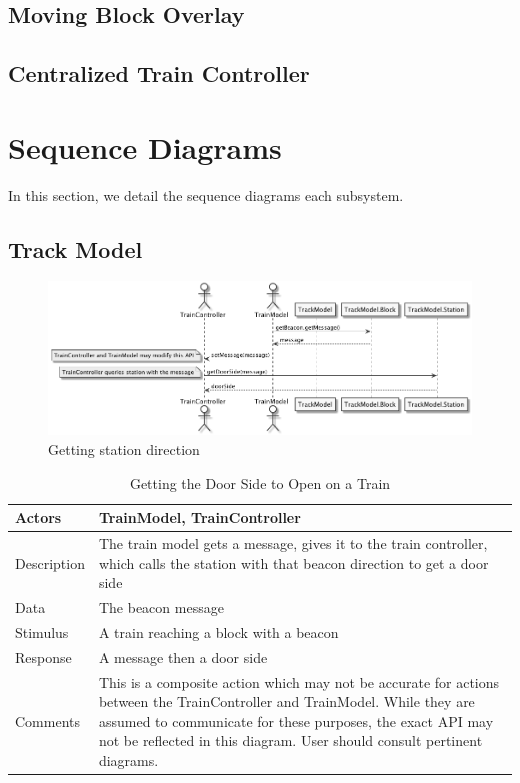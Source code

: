 \documentclass[]{article}
\begin{document}
\subsection{Moving Block Overlay}
\subsection{Centralized Train Controller}


\section{Sequence Diagrams}
In this section, we detail the sequence diagrams each subsystem.
\subsection{Track Model}
\begin{figure}[H]
	\centering
	\includegraphics[scale=.5]{getStationDirection.png}
	\caption{Getting station direction}
\end{figure}
\begin{table}[H]
	\centering
	\caption{Getting the Door Side to Open on a Train}
	\begin{tabular}{|l|l|}
		\hline
		Actors & \parbox[t]{10cm}{TrainModel, TrainController} \\ \hline
		Description & \parbox[t]{10cm}{The train model gets a message, gives it to the train controller, which calls the station with that beacon direction to get a door side} \\ \hline
		Data &  \parbox[t]{10cm}{The beacon message} \\ \hline
		Stimulus &  \parbox[t]{10cm}{A train reaching a block with a beacon} \\ \hline
		Response & \parbox[t]{10cm}{A message then a door side}\\ \hline
		Comments & \parbox[t]{10cm}{This is a composite action which may not be accurate for actions between the TrainController and TrainModel. While they are assumed to communicate for these purposes, the exact API may not be reflected in this diagram. User should consult pertinent diagrams.}  \\ \hline
	\end{tabular}
\end{table}
\end{document}
